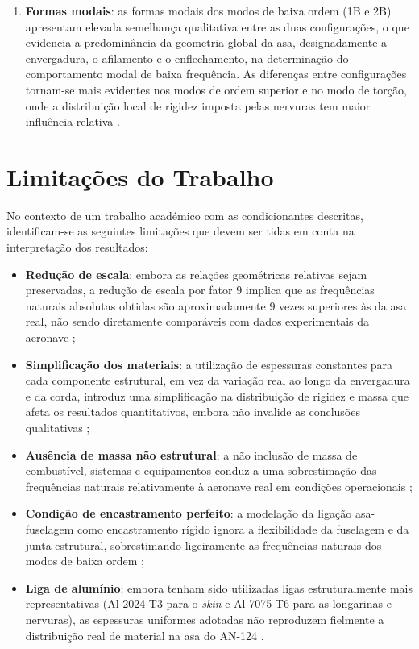 \documentclass[11pt,oneside,a4paper,final]{report}
\begin{document}
\begin{enumerate}
    \item \textbf{Formas modais}: as formas modais dos modos de baixa ordem (1B e 2B) apresentam elevada semelhança qualitativa entre as duas configurações, o que evidencia a predominância da geometria global da asa, designadamente a envergadura, o afilamento e o enflechamento, na determinação do comportamento modal de baixa frequência. As diferenças entre configurações tornam-se mais evidentes nos modos de ordem superior e no modo de torção, onde a distribuição local de rigidez imposta pelas nervuras tem maior influência relativa \cite{Bisplinghoff1996, Dowell2004}.
\end{enumerate}

\section{Limitações do Trabalho}

No contexto de um trabalho académico com as condicionantes descritas, identificam-se as seguintes limitações que devem ser tidas em conta na interpretação dos resultados:

\begin{itemize}
    \item \textbf{Redução de escala}: embora as relações geométricas relativas sejam preservadas, a redução de escala por fator 9 implica que as frequências naturais absolutas obtidas são aproximadamente 9 vezes superiores às da asa real, não sendo diretamente comparáveis com dados experimentais da aeronave \cite{Craig2006};

    \item \textbf{Simplificação dos materiais}: a utilização de espessuras constantes para cada componente estrutural, em vez da variação real ao longo da envergadura e da corda, introduz uma simplificação na distribuição de rigidez e massa que afeta os resultados quantitativos, embora não invalide as conclusões qualitativas \cite{Megson2012};

    \item \textbf{Ausência de massa não estrutural}: a não inclusão de massa de combustível, sistemas e equipamentos conduz a uma sobrestimação das frequências naturais relativamente à aeronave real em condições operacionais \cite{Wright2015};

    \item \textbf{Condição de encastramento perfeito}: a modelação da ligação asa-fuselagem como encastramento rígido ignora a flexibilidade da fuselagem e da junta estrutural, sobrestimando ligeiramente as frequências naturais dos modos de baixa ordem \cite{Hodges2011};

    \item \textbf{Liga de alumínio}: embora tenham sido utilizadas ligas estruturalmente mais representativas (Al 2024-T3 para o \textit{skin} e Al 7075-T6 para as longarinas e nervuras), as espessuras uniformes adotadas não reproduzem fielmente a distribuição real de material na asa do AN-124 \cite{Megson2012, ASM2008}.
\end{itemize}





\end{document}
